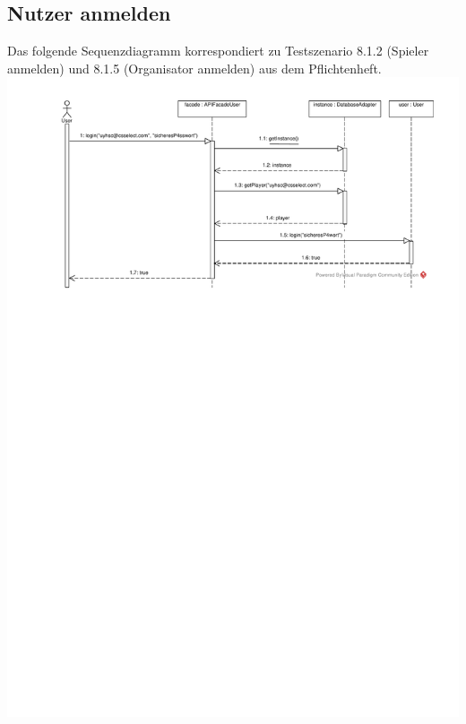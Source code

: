 \documentclass[a4paper]{scrreprt}
\begin{document}
	\subsection{Nutzer anmelden}
	Das folgende Sequenzdiagramm korrespondiert zu Testszenario 8.1.2 (Spieler anmelden) und 8.1.5 (Organisator anmelden) aus dem Pflichtenheft.
	\includegraphics[width=\textwidth]{img/Spieler_anmelden.pdf}
\end{document}
